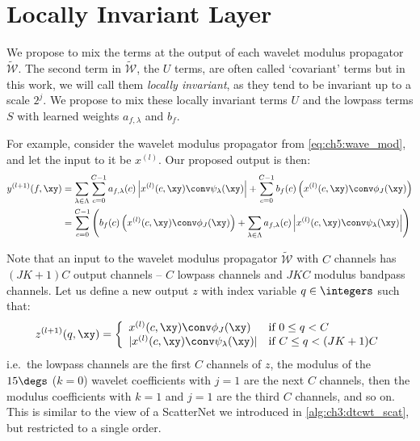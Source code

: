 \section{Locally Invariant Layer} \label{sec:ch5:method}
We propose to mix the terms at the output of each wavelet modulus propagator
$\widetilde{\mathcal{W}}$. The second term in $\widetilde{\mathcal{W}}$, the $U$
terms, are often called `covariant' terms but in this work, we will call them
\emph{locally invariant}, as they tend to be invariant up to a scale $2^j$. We propose
to mix these locally invariant terms $U$ and the lowpass terms $S$ with learned
weights $a_{f,\lambda}$ and $b_f$. 

For example, consider the wavelet modulus propagator from
\eqref{eq:ch5:wave_mod}, and let the input to it be $x^{(l)}$. Our proposed
output is then:
%
\begin{align} \label{eq:ch5:comb1}
  y^{(l+1)}(f, \xy)  &=  \sum_{\lambda\in \Lambda} \sum_{c=0}^{C-1} a_{f, \lambda}(c) \left|x^{(l)}(c, \xy)\conv \psi_\lambda(\xy)\right|
                     +  \sum_{c=0}^{C-1} b_f(c)\left(x^{(l)}(c, \xy) \conv \phi_J(\xy)\right) \\
                     &=\sum_{c=0}^{C-1} \left( b_f(c)\left(x^{(l)}(c, \xy) \conv \phi_J(\xy)\right) + 
                     \sum_{\lambda\in \Lambda} a_{f, \lambda}(c) \left|x^{(l)}(c, \xy)\conv \psi_\lambda(\xy)\right|\right) \label{eq:ch5:layer}
\end{align}

Note that an input to the wavelet modulus propagator $\widetilde{\mathcal{W}}$ with $C$ channels
has $(JK+1)C$ output channels -- $C$ lowpass channels and $JKC$ modulus bandpass
channels. Let us define a new output $z$ with index variable $q\in \integers$ such that:
%
\begin{equation}
  z^{(l+1)}(q, \xy) =  \left\{
    \begin{array}{ll}
      x^{(l)}(c, \xy) \conv \phi_J(\xy) & \mbox{if } 0 \leq q < C \\
      |x^{(l)}(c, \xy)\conv \psi_\lambda(\xy)| & \mbox{if }	C \leq q < (JK+1)C
    \end{array}
    \right. \label{eq:ch5:z}
\end{equation}
i.e.\ the lowpass channels are the first $C$ channels of $z$, the modulus of the
$15\degs$ ($k=0$) wavelet coefficients with $j=1$ are the next $C$ channels,
then the modulus coefficients with $k=1$ and $j=1$ are the third $C$ channels,
and so on. This is similar to the view of a ScatterNet we introduced in \autoref{alg:ch3:dtcwt_scat},
but restricted to a single order.

